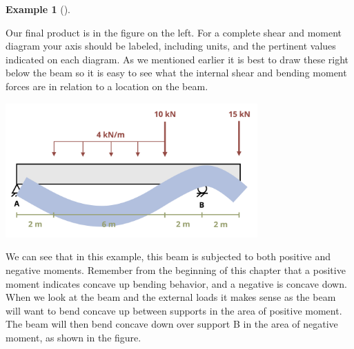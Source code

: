 \documentclass[
  letterpaper,
  DIV=11,
  numbers=noendperiod]{scrreprt}
\theoremstyle{definition}
\newtheorem{example}{Example}[chapter]
\theoremstyle{remark}
\begin{document}
\begin{tcolorbox}
\begin{example}[]
\begin{tcolorbox}
Our final product is in the figure on the left. For a complete shear and
moment diagram your axis should be labeled, including units, and the
pertinent values indicated on each diagram. As we mentioned earlier it
is best to draw these right below the beam so it is easy to see what the
internal shear and bending moment forces are in relation to a location
on the beam.

\begin{center}
\includegraphics[width=3.80208in,height=\textheight]{images/CH7 PNGs/example 7.3 part 14.png}
\end{center}

We can see that in this example, this beam is subjected to both positive
and negative moments. Remember from the beginning of this chapter that a
positive moment indicates concave up bending behavior, and a negative is
concave down. When we look at the beam and the external loads it makes
sense as the beam will want to bend concave up between supports in the
area of positive moment. The beam will then bend concave down over
support B in the area of negative moment, as shown in the figure.

\end{tcolorbox}

\end{example}

\end{tcolorbox}
\end{document}
